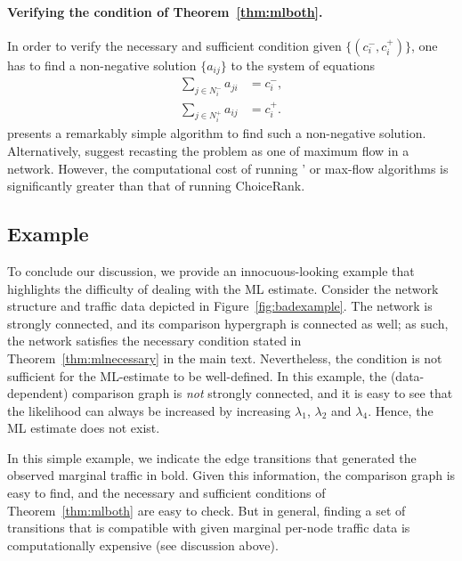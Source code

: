 \paragraph{Verifying the condition of Theorem~\ref{thm:mlboth}.}
In order to verify the necessary and sufficient condition given $\{ (c^-_i, c^+_i) \}$, one has to find a non-negative solution $\{ a_{ij} \}$ to the system of equations
\begin{align*}
\sum_{j \in N^-_i} a_{ji} &= c^-_i, \\
\sum_{j \in N^+_i} a_{ij} &= c^+_i.
\end{align*}
\citet{dines1926positive} presents a remarkably simple algorithm to find such a non-negative solution.
Alternatively, \citet{kumar2015inverting} suggest recasting the problem as one of maximum flow in a network.
However, the computational cost of running \citeauthor{dines1926positive}' or max-flow algorithms is significantly greater than that of running ChoiceRank.

\subsection{Example}

To conclude our discussion, we provide an innocuous-looking example that highlights the difficulty of dealing with the ML estimate.
Consider the network structure and traffic data depicted in Figure~\ref{fig:badexample}.
The network is strongly connected, and its comparison hypergraph is connected as well; as such, the network satisfies the necessary condition stated in Theorem~\ref{thm:mlnecessary} in the main text.
Nevertheless, the condition is not sufficient for the ML-estimate to be well-defined.
In this example, the (data-dependent) comparison graph is \emph{not} strongly connected, and it is easy to see that the likelihood can always be increased by increasing $\lambda_1$, $\lambda_2$ and $\lambda_4$.
Hence, the ML estimate does not exist.

In this simple example, we indicate the edge transitions that generated the observed marginal traffic in bold.
Given this information, the comparison graph is easy to find, and the necessary and sufficient conditions of Theorem~\ref{thm:mlboth} are easy to check.
But in general, finding a set of transitions that is compatible with given marginal per-node traffic data is computationally expensive (see discussion above).
